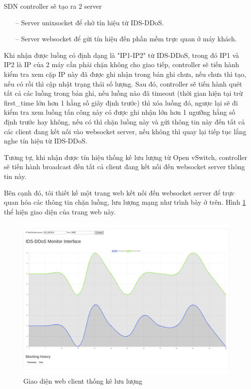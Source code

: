 SDN controller sẽ tạo ra 2 server

\begin{itemize}
	\item [--] Server unixsocket để chờ tín hiệu từ IDS-DDoS.
	\item [--] Server websocket để gửi tín hiệu đến phần mềm trực quan ở máy khách.
\end{itemize}

Khi nhận được luồng có định dạng là "IP1-IP2" từ IDS-DDoS, trong đó IP1 và IP2 là IP của 2 máy cần phải chặn không cho giao tiếp, controller sẽ tiến hành kiểm tra xem cặp IP này đã được ghi nhận trong bản ghi chưa, nếu chưa thì tạo, nếu có rồi thì cập nhật trạng thái số lượng. Sau đó, controller sẽ tiến hành quét tất cả các luồng trong bản ghi, nếu luồng nào đã timeout (thời gian hiện tại trừ first\_time lớn hơn 1 hằng số giây định trước) thì xóa luồng đó, ngược lại sẽ đi kiểm tra xem luồng tấn công này có được ghi nhận lớn hơn 1 ngưỡng hằng số định trước hay không, nếu có thì chặn luồng này và gửi thông tin này đến tất cả các client đang kết nối vào websocket server, nếu không thì quay lại tiếp tục lắng nghe tín hiệu từ IDS-DDoS.

Tương tự, khi nhận được tín hiệu thống kê lưu lượng từ Open vSwitch, controller sẽ tiến hành broadcast đến tất cả client đang kết nối đến websocket server thông tin này.

Bên cạnh đó, tôi thiết kế một trang web kết nối đến websocket server để trực quan hóa các thông tin chặn luồng, lưu lượng mạng như trình bày ở trên. Hình \ref{fig:webclient-interface} thể hiện giao diện của trang web này.

\begin{figure}[ht!]
	\includegraphics[width=\linewidth]{fig/webclient-interface.png}
	\caption{Giao diện web client thống  kê lưu lượng}
	\label{fig:webclient-interface}
\end{figure}


